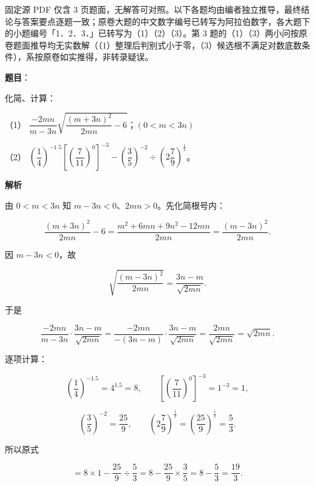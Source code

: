 

\begin{gktip}
固定源 PDF 仅含 3 页题面，无解答可对照。以下各题均由编者独立推导，最终结论与答案要点逐题一致；原卷大题的中文数字编号已转写为阿拉伯数字，各大题下的小题编号「1．2．3．」已转写为（1）（2）（3）。第 3 题的（1）（3）两小问按原卷题面推导均无实数解（（1）整理后判别式小于零，（3）候选根不满足对数底数条件），系按原卷如实推得，非转录疑误。
\end{gktip}

\begin{answer}

\textbf{题目}：

化简、计算：

（1） $\dfrac{-2mn}{m-3n}\sqrt{\dfrac{(m+3n)^2}{2mn}-6}$；$(0<m<3n)$

（2） $\left(\dfrac14\right)^{-1.5}\left[\left(\dfrac{7}{11}\right)^0\right]^{-3}-\left(\dfrac35\right)^{-2}\div\left(2\dfrac79\right)^{\frac12}$。

\textbf{解析}


由 $0<m<3n$ 知 $m-3n<0$、$2mn>0$。先化简根号内：

\nopagebreak[4]
\[
\frac{(m+3n)^2}{2mn}-6
=\frac{m^2+6mn+9n^2-12mn}{2mn}
=\frac{(m-3n)^2}{2mn}.
\]

因 $m-3n<0$，故

\nopagebreak[4]
\[
\sqrt{\frac{(m-3n)^2}{2mn}}=\frac{3n-m}{\sqrt{2mn}}.
\]

于是

\nopagebreak[4]
\[
\frac{-2mn}{m-3n}\cdot\frac{3n-m}{\sqrt{2mn}}
=\frac{-2mn}{-(3n-m)}\cdot\frac{3n-m}{\sqrt{2mn}}
=\frac{2mn}{\sqrt{2mn}}
=\sqrt{2mn}.
\]


逐项计算：

\nopagebreak[4]
\[
\left(\frac14\right)^{-1.5}=4^{1.5}=8,\qquad
\left[\left(\frac{7}{11}\right)^0\right]^{-3}=1^{-3}=1,
\]

\nopagebreak[4]
\[
\left(\frac35\right)^{-2}=\frac{25}{9},\qquad
\left(2\frac79\right)^{\frac12}=\left(\frac{25}{9}\right)^{\frac12}=\frac53.
\]

所以原式

\nopagebreak[4]
\[
=8\times1-\frac{25}{9}\div\frac53
=8-\frac{25}{9}\times\frac35
=8-\frac53
=\frac{19}{3}.
\]



\end{answer}
